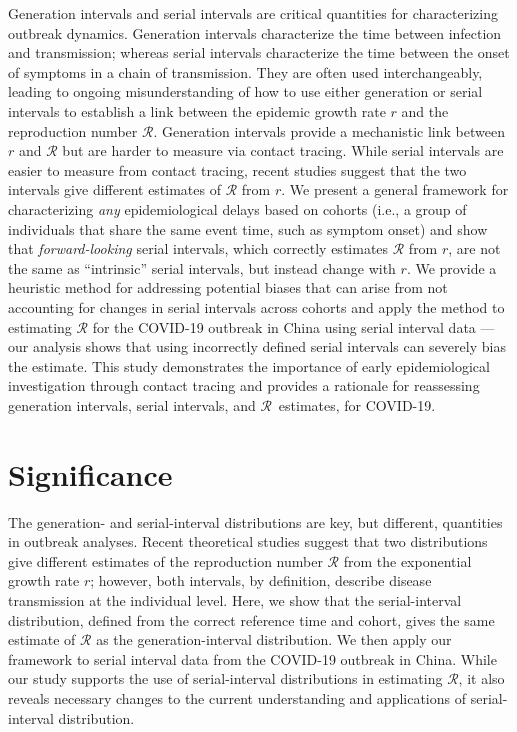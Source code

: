 \documentclass[12pt]{article}
\newcommand{\RR}{\ensuremath{{\mathcal R}}\xspace}
\begin{document}
Generation intervals and serial intervals are critical quantities for characterizing outbreak dynamics.
Generation intervals characterize the time between infection and transmission; whereas serial intervals characterize the time between the onset of symptoms in a chain of transmission.
They are often used interchangeably, leading to ongoing misunderstanding of how to use either generation or serial intervals to establish a link between the epidemic growth rate $r$ and the reproduction number \RR.
Generation intervals provide a mechanistic link between $r$ and \RR but are harder to measure via contact tracing.
While serial intervals are easier to measure from contact tracing, recent studies suggest that the two intervals give different estimates of \RR from $r$.
We present a general framework for characterizing \emph{any} epidemiological delays based on cohorts (i.e., a group of individuals that share the same event time, such as symptom onset) and show that \emph{forward-looking} serial intervals, which correctly estimates \RR from $r$, are not the same as ``intrinsic'' serial intervals, but instead change with $r$.
We provide a heuristic method for addressing potential biases that can arise from not accounting for changes in serial intervals across cohorts and apply the method to estimating \RR for the COVID-19 outbreak in China using serial interval data --- our analysis shows that using incorrectly defined serial intervals can severely bias the estimate.
This study demonstrates the importance of early epidemiological investigation through contact tracing and provides a rationale for reassessing generation intervals, serial intervals, and \RR\ estimates, for COVID-19.

\section*{Significance}

The generation- and serial-interval distributions are key, but different, quantities in outbreak analyses.
Recent theoretical studies suggest that two distributions give different estimates of the reproduction number \RR from the exponential growth rate $r$;
however, both intervals, by definition, describe disease transmission at the individual level.
Here, we show that the serial-interval distribution, defined from the correct reference time and cohort, gives the same estimate of \RR as the generation-interval distribution.
We then apply our framework to serial interval data from the COVID-19 outbreak in China.
While our study supports the use of serial-interval distributions in estimating \RR, it also reveals necessary changes to the current understanding and applications of serial-interval distribution.
\end{document}
